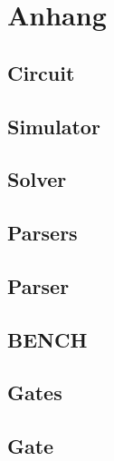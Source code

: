 \section{Anhang}
\subsection{Circuit}
\label{lst:circuit}


\subsection{Simulator}
\label{lst:simulator}


\subsection{Solver}
\label{lst:solver}


\subsection{Parsers}
\label{lst:parsers}


\subsection{Parser}
\label{lst:parser}


\subsection{BENCH}
\label{lst:bench}


\subsection{Gates}
\label{lst:gates}


\subsection{Gate}
\label{lst:gate}


